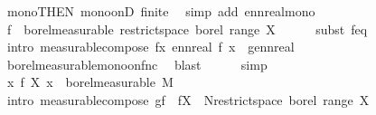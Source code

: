 \begin{isabellebody}
\ mono{\isacharbrackleft}{\kern0pt}THEN\ mono{\isacharunderscore}{\kern0pt}onD{\isacharbrackright}{\kern0pt}\ finite\ \isamarkupfalse%
\ {\isacharparenleft}{\kern0pt}simp\ add{\isacharcolon}{\kern0pt}\ enn{}real{\isacharunderscore}{\kern0pt}mono{\isacharparenright}{\kern0pt}\isanewline
\ \ \isamarkupfalse%
\ \isamarkupfalse%
\ {\isachardoublequoteopen}f\ {\isasymin}\ borel{\isacharunderscore}{\kern0pt}measurable\ {\isacharparenleft}{\kern0pt}restrict{\isacharunderscore}{\kern0pt}space\ borel\ {\isacharparenleft}{\kern0pt}range\ X{\isacharparenright}{\kern0pt}{\isacharparenright}{\kern0pt}{\isachardoublequoteclose}\isanewline
\ \ \ \ \isamarkupfalse%
\ {\isacharparenleft}{\kern0pt}subst\ f{\isacharunderscore}{\kern0pt}eq{\isacharparenright}{\kern0pt}\isanewline
\ \ \ \ \isamarkupfalse%
\ {\isacharparenleft}{\kern0pt}intro\ measurable{\isacharunderscore}{\kern0pt}compose{\isacharbrackleft}{\kern0pt}\ f{\isacharequal}{\kern0pt}{\isachardoublequoteopen}{\isasymlambda}x{\isachardot}{\kern0pt}\ enn{}real\ {\isacharparenleft}{\kern0pt}f\ x{\isacharparenright}{\kern0pt}{\isachardoublequoteclose}\ \ g{\isacharequal}{\kern0pt}ennreal{\isacharbrackright}{\kern0pt}{\isacharparenright}{\kern0pt}\isanewline
\ \ \ \ \isamarkupfalse%
\ borel{\isacharunderscore}{\kern0pt}measurable{\isacharunderscore}{\kern0pt}mono{\isacharunderscore}{\kern0pt}on{\isacharunderscore}{\kern0pt}fnc\ \isamarkupfalse%
\ blast\isanewline
\ \ \ \ \isamarkupfalse%
\ simp\isanewline
\ \ \ \ \isamarkupfalse%
\isanewline
\ \ \isamarkupfalse%
\ \isamarkupfalse%
\ {\isachardoublequoteopen}{\isacharparenleft}{\kern0pt}{\isasymlambda}x{\isachardot}{\kern0pt}\ f\ {\isacharparenleft}{\kern0pt}X\ x{\isacharparenright}{\kern0pt}{\isacharparenright}{\kern0pt}\ {\isasymin}\ borel{\isacharunderscore}{\kern0pt}measurable\ M{\isachardoublequoteclose}\isanewline
\ \ \ \ \isamarkupfalse%
\ {\isacharparenleft}{\kern0pt}intro\ measurable{\isacharunderscore}{\kern0pt}compose{\isacharbrackleft}{\kern0pt}\ g{\isacharequal}{\kern0pt}f\ \ f{\isacharequal}{\kern0pt}X\ \ N{\isacharequal}{\kern0pt}{\isachardoublequoteopen}restrict{\isacharunderscore}{\kern0pt}space\ borel\ {\isacharparenleft}{\kern0pt}range\ X{\isacharparenright}{\kern0pt}{\isachardoublequoteclose}{\isacharbrackright}{\kern0pt}{\isacharparenright}{\kern0pt}\isanewline

\end{isabellebody}
